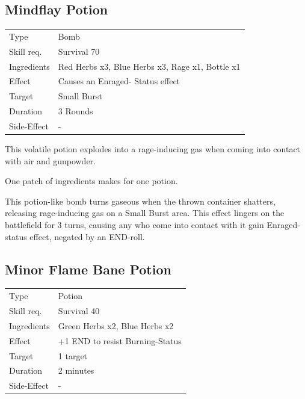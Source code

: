 \documentclass[11pt,a4paper,twocolumn]{book}
\begin{document}
\subsection*{Mindflay Potion}
{
	\begin{tabu} to 75mm{| X[l,4] | X[l,8] |}
		\hline
		Type 			& Bomb 														\\
        Skill req.	    & Survival 70 												\\
        Ingredients     & Red Herbs x3, Blue Herbs x3, Rage x1, Bottle x1			\\
        Effect     		& Causes an Enraged- Status effect 							\\
        Target      	& Small Burst													\\
        Duration  		& 3 Rounds 												\\
        Side-Effect     & -															\\ \hline
	\end{tabu}
		
}

\medskip

This volatile potion explodes into a rage-inducing gas when coming into contact with air and gunpowder.

One patch of ingredients makes for one potion.

This potion-like bomb turns gaseous when the thrown container shatters, releasing rage-inducing gas on a Small Burst area. This effect lingers on the battlefield for 3 turns, causing any who come into contact with it gain Enraged- status effect, negated by an END-roll.


\subsection*{Minor Flame Bane Potion}
{
	\begin{tabu} to 75mm{| X[l,4] | X[l,8] |}
		\hline
		Type 			& Potion 													\\
        Skill req.	    & Survival 40 												\\
        Ingredients     & Green Herbs x2, Blue Herbs x2								\\
        Effect     		& +1 END to resist Burning-Status 							\\
        Target      	& 1 target													\\
        Duration  		& 2 minutes	 												\\
        Side-Effect     & -															\\ \hline
	\end{tabu}
		
}
\end{document}
